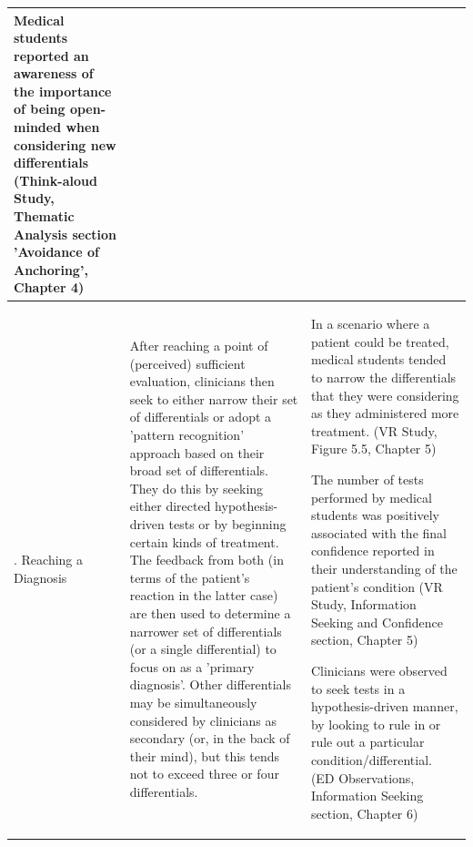 \documentclass[a4paper, nobind]{templates/ociamthesis}
\begin{document}
\begin{longtable}[t]{>{\raggedright\arraybackslash}p{5em}|>{\raggedright\arraybackslash}p{12em}|>{\raggedright\arraybackslash}p{16em}}
Medical students reported an awareness of the importance of being open-minded when considering new differentials (Think-aloud Study, Thematic Analysis section 'Avoidance of Anchoring', Chapter 4)\\
\hline
3. Reaching a Diagnosis & After reaching a point of (perceived) sufficient evaluation, clinicians then seek to either narrow their set of differentials or adopt a 'pattern recognition' approach based on their broad set of differentials. They do this by seeking either directed hypothesis-driven tests or by beginning certain kinds of treatment. The feedback from both (in terms of the patient's reaction in the latter case) are then used to determine a narrower set of differentials (or a single differential) to focus on as a 'primary diagnosis'. Other differentials may be simultaneously considered by clinicians as secondary (or, in the back of their mind), but this tends not to exceed three or four differentials. & In a scenario where a patient could be treated, medical students tended to narrow the differentials that they were considering as they administered more treatment. (VR Study, Figure 5.5, Chapter 5)

The number of tests performed by medical students was positively associated with the final confidence reported in their understanding of the patient's condition (VR Study, Information Seeking and Confidence section, Chapter 5)

Clinicians were observed to seek tests in a hypothesis-driven manner, by looking to rule in or rule out a particular condition/differential. (ED Observations, Information Seeking section, Chapter 6)\\
\hline
\end{longtable}
\end{document}
